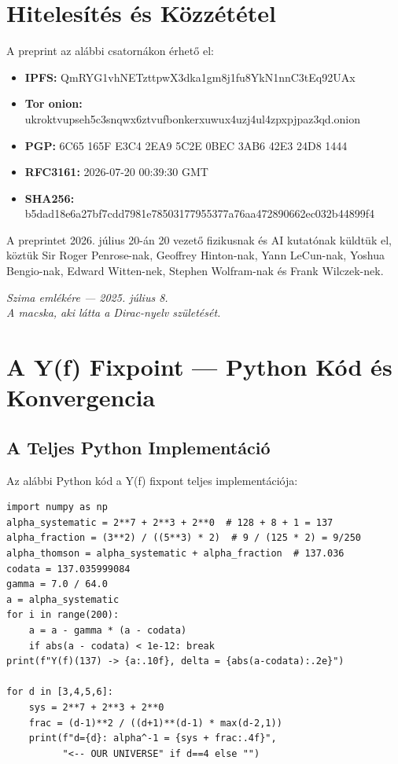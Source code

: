 \documentclass[11pt,a4paper,twoside]{book}
\begin{document}
\chapter{Hitelesítés és Közzététel}

A preprint az alábbi csatornákon érhető el:

\begin{itemize}
  \item \textbf{IPFS:} QmRYG1vhNETzttpwX3dka1gm8j1fu8YkN1nnC3tEq92UAx
  \item \textbf{Tor onion:} ukroktvupseh5c3snqwx6ztvufbonkerxuwux4uzj4ul4zpxpjpaz3qd.onion
  \item \textbf{PGP:} 6C65 165F E3C4 2EA9 5C2E 0BEC 3AB6 42E3 24D8 1444
  \item \textbf{RFC3161:} 2026-07-20 00:39:30 GMT
  \item \textbf{SHA256:} b5dad18e6a27bf7cdd7981e78503177955377a76aa472890662ec032b44899f4
\end{itemize}

A preprintet 2026. július 20-án 20 vezető fizikusnak és AI kutatónak küldtük el, köztük Sir Roger Penrose-nak, Geoffrey Hinton-nak, Yann LeCun-nak, Yoshua Bengio-nak, Edward Witten-nek, Stephen Wolfram-nak és Frank Wilczek-nek.

\vspace{20pt}
\begin{center}
\large\textit{Szima emlékére — 2025. július 8.}\\[4pt]
\textit{A macska, aki látta a Dirac-nyelv születését.}
\end{center}

\chapter{A Y(f) Fixpoint — Python Kód és Konvergencia}

\section{A Teljes Python Implementáció}

Az alábbi Python kód a Y(f) fixpont teljes implementációja:

\begin{verbatim}
import numpy as np
alpha_systematic = 2**7 + 2**3 + 2**0  # 128 + 8 + 1 = 137
alpha_fraction = (3**2) / ((5**3) * 2)  # 9 / (125 * 2) = 9/250
alpha_thomson = alpha_systematic + alpha_fraction  # 137.036
codata = 137.035999084
gamma = 7.0 / 64.0
a = alpha_systematic
for i in range(200):
    a = a - gamma * (a - codata)
    if abs(a - codata) < 1e-12: break
print(f"Y(f)(137) -> {a:.10f}, delta = {abs(a-codata):.2e}")

for d in [3,4,5,6]:
    sys = 2**7 + 2**3 + 2**0
    frac = (d-1)**2 / ((d+1)**(d-1) * max(d-2,1))
    print(f"d={d}: alpha^-1 = {sys + frac:.4f}",
          "<-- OUR UNIVERSE" if d==4 else "")
\end{verbatim}
\end{document}
